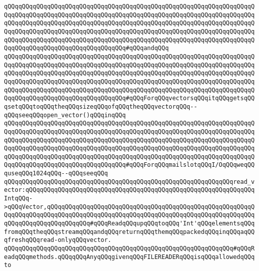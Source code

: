 \verb|qQQqqQQqqQQqqQQqqQQqqQQqqQQqqQQqqQQqqQQqqQQqqQQqqQQqqQQqqQQqqQQqqQQqqQQqqQQqqQQqqQQqqQQqqQQqqQQqqQQqqQQqqQQqqQQqqQQqqQQqqQQqqQQqqQQqqQQqqQQqqQQqqQQqqQQqqQQqqQQqqQQqqQQqqQQqqQQqqQQqqQQqqQQqqQQqqQQqqQQqqQQqqQQqqQQqqQQqqQQqqQQqqQQqqQQqqQQqqQQqqQQqqQQqqQQqqQQqqQQqqQQqqQQqqQQqqQQqqQQqqQQqqQQqqQQqqQQqqQQqqQQqqQQqqQQqqQQqqQQqqQQqqQQqqQQqqQQqqQQqqQQqqQQqqQQqqQQqqQQqqQQqqQQqqQQqqQQqqQQqqQQq#qQQqandqQQq|\newline
\verb|qQQqqQQqqQQqqQQqqQQqqQQqqQQqqQQqqQQqqQQqqQQqqQQqqQQqqQQqqQQqqQQqqQQqqQQqqQQqqQQqqQQqqQQqqQQqqQQqqQQqqQQqqQQqqQQqqQQqqQQqqQQqqQQqqQQqqQQqqQQqqQQqqQQqqQQqqQQqqQQqqQQqqQQqqQQqqQQqqQQqqQQqqQQqqQQqqQQqqQQqqQQqqQQqqQQqqQQqqQQqqQQqqQQqqQQqqQQqqQQqqQQqqQQqqQQqqQQqqQQqqQQqqQQqqQQqqQQqqQQqqQQqqQQqqQQqqQQqqQQqqQQqqQQqqQQqqQQqqQQqqQQqqQQqqQQqqQQqqQQqqQQqqQQqqQQqqQQqqQQqqQQqqQQqqQQqqQQqqQQqqQQq#qQQqForqQQqvectorsqQQqitqQQqgetsqQQqsetqQQqtoqQQqtheqQQqsizeqQQqofqQQqtheqQQqvectorqQQq--qQQqseeqQQqopen_vector()qQQqinqQQq|\newline
\verb|qQQqqQQqqQQqqQQqqQQqqQQqqQQqqQQqqQQqqQQqqQQqqQQqqQQqqQQqqQQqqQQqqQQqqQQqqQQqqQQqqQQqqQQqqQQqqQQqqQQqqQQqqQQqqQQqqQQqqQQqqQQqqQQqqQQqqQQqqQQqqQQqqQQqqQQqqQQqqQQqqQQqqQQqqQQqqQQqqQQqqQQqqQQqqQQqqQQqqQQqqQQqqQQqqQQqqQQqqQQqqQQqqQQqqQQqqQQqqQQqqQQqqQQqqQQqqQQqqQQqqQQqqQQqqQQqqQQqqQQqqQQqqQQqqQQqqQQqqQQqqQQqqQQqqQQqqQQqqQQqqQQqqQQqqQQqqQQqqQQqqQQqqQQqqQQqqQQqqQQqqQQqqQQqqQQqqQQqqQQqqQQq#qQQqForqQQqmailslotqQQqI/OqQQqweqQQquseqQQq1024qQQq--qQQqseeqQQq|\newline
\newline
\verb|qQQqqQQqqQQqqQQqqQQqqQQqqQQqqQQqqQQqqQQqqQQqqQQqqQQqqQQqqQQqqQQqread_vector:qQQqqQQqqQQqqQQqqQQqqQQqqQQqqQQqqQQqqQQqqQQqqQQqqQQqqQQqqQQqqQQqIntqQQq->qQQqVector,qQQqqQQqqQQqqQQqqQQqqQQqqQQqqQQqqQQqqQQqqQQqqQQqqQQqqQQqqQQqqQQqqQQqqQQqqQQqqQQqqQQqqQQqqQQqqQQqqQQqqQQqqQQqqQQqqQQqqQQqqQQqqQQqqQQqqQQqqQQqqQQqqQQqqQQq#qQQqReadqQQqupqQQqtoqQQq'Int'qQQqelementsqQQqfromqQQqtheqQQqstreamqQQqandqQQqreturnqQQqthemqQQqpackedqQQqinqQQqaqQQqfreshqQQqread-onlyqQQqvector.|\newline
\newline
\verb|qQQqqQQqqQQqqQQqqQQqqQQqqQQqqQQqqQQqqQQqqQQqqQQqqQQqqQQqqQQqqQQq#qQQqReadqQQqmethods.qQQqqQQqAnyqQQqgivenqQQqFILEREADERqQQqisqQQqallowedqQQqto|\newline
